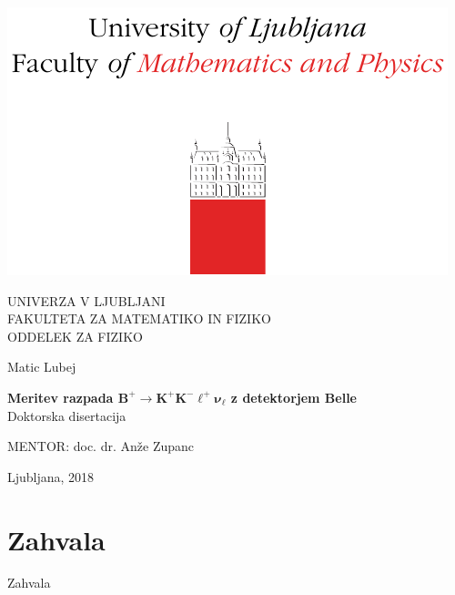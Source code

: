 \cleardoublepage
\begin{otherlanguage}{slovene}
\begin{center}

\includegraphics[trim={0 0 0 2cm},clip]{fig/logo}

{\large UNIVERZA V LJUBLJANI\\
FAKULTETA ZA MATEMATIKO IN FIZIKO\\
ODDELEK ZA FIZIKO\\}

\vspace{5cm}

{\Large Matic Lubej\\}

\vspace{10mm}

{\bf \Large Meritev razpada $\bm{B^+ \to K^+K^-\ell^+\nu_\ell}$ z detektorjem Belle\\}
\vspace{5mm}
{\large Doktorska disertacija}\\

\vfill

{\large MENTOR: doc. dr. An\v ze Zupanc\\
}



\vspace{2cm}

{\large Ljubljana, 2018}

\end{center}



\cleardoublepage

\pagestyle{plain}
\vfill
\chapter*{Zahvala}
Zahvala
\pagestyle{empty}


\end{otherlanguage}
